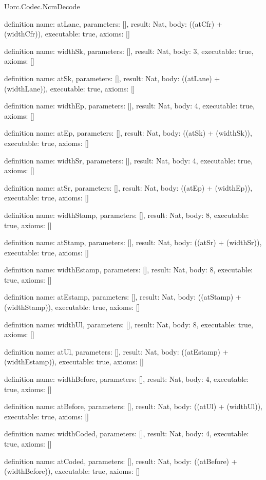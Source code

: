 \begin{lexlean}{Uorc.Codec.NcmDecode}
\begin{semanticmodule}
definition{
  name: atLane,
  parameters: [],
  result: Nat,
  body: ((atCfr) + (widthCfr)),
  executable: true,
  axioms: []
}

definition{
  name: widthSk,
  parameters: [],
  result: Nat,
  body: 3,
  executable: true,
  axioms: []
}

definition{
  name: atSk,
  parameters: [],
  result: Nat,
  body: ((atLane) + (widthLane)),
  executable: true,
  axioms: []
}

definition{
  name: widthEp,
  parameters: [],
  result: Nat,
  body: 4,
  executable: true,
  axioms: []
}

definition{
  name: atEp,
  parameters: [],
  result: Nat,
  body: ((atSk) + (widthSk)),
  executable: true,
  axioms: []
}

definition{
  name: widthSr,
  parameters: [],
  result: Nat,
  body: 4,
  executable: true,
  axioms: []
}

definition{
  name: atSr,
  parameters: [],
  result: Nat,
  body: ((atEp) + (widthEp)),
  executable: true,
  axioms: []
}

definition{
  name: widthStamp,
  parameters: [],
  result: Nat,
  body: 8,
  executable: true,
  axioms: []
}

definition{
  name: atStamp,
  parameters: [],
  result: Nat,
  body: ((atSr) + (widthSr)),
  executable: true,
  axioms: []
}

definition{
  name: widthEstamp,
  parameters: [],
  result: Nat,
  body: 8,
  executable: true,
  axioms: []
}

definition{
  name: atEstamp,
  parameters: [],
  result: Nat,
  body: ((atStamp) + (widthStamp)),
  executable: true,
  axioms: []
}

definition{
  name: widthUl,
  parameters: [],
  result: Nat,
  body: 8,
  executable: true,
  axioms: []
}

definition{
  name: atUl,
  parameters: [],
  result: Nat,
  body: ((atEstamp) + (widthEstamp)),
  executable: true,
  axioms: []
}

definition{
  name: widthBefore,
  parameters: [],
  result: Nat,
  body: 4,
  executable: true,
  axioms: []
}

definition{
  name: atBefore,
  parameters: [],
  result: Nat,
  body: ((atUl) + (widthUl)),
  executable: true,
  axioms: []
}

definition{
  name: widthCoded,
  parameters: [],
  result: Nat,
  body: 4,
  executable: true,
  axioms: []
}

definition{
  name: atCoded,
  parameters: [],
  result: Nat,
  body: ((atBefore) + (widthBefore)),
  executable: true,
  axioms: []
}


\end{semanticmodule}
\end{lexlean}
